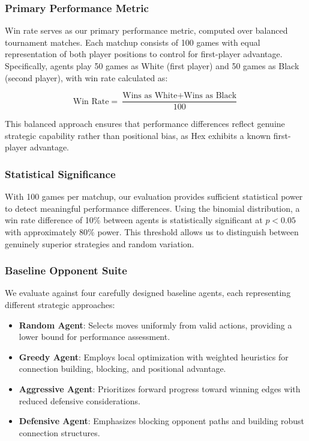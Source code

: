 \documentclass[conference]{IEEEtran}
\begin{document}
\subsubsection{Primary Performance Metric}

Win rate serves as our primary performance metric, computed over balanced tournament matches. Each matchup consists of 100 games with equal representation of both player positions to control for first-player advantage. Specifically, agents play 50 games as White (first player) and 50 games as Black (second player), with win rate calculated as:

\begin{equation}
\text{Win Rate} = \frac{\text{Wins as White} + \text{Wins as Black}}{100}
\end{equation}

This balanced approach ensures that performance differences reflect genuine strategic capability rather than positional bias, as Hex exhibits a known first-player advantage.

\subsubsection{Statistical Significance}

With 100 games per matchup, our evaluation provides sufficient statistical power to detect meaningful performance differences. Using the binomial distribution, a win rate difference of 10\% between agents is statistically significant at $p < 0.05$ with approximately 80\% power. This threshold allows us to distinguish between genuinely superior strategies and random variation.

\subsubsection{Baseline Opponent Suite}

We evaluate against four carefully designed baseline agents, each representing different strategic approaches:

\begin{itemize}
\item \textbf{Random Agent}: Selects moves uniformly from valid actions, providing a lower bound for performance assessment.
\item \textbf{Greedy Agent}: Employs local optimization with weighted heuristics for connection building, blocking, and positional advantage.
\item \textbf{Aggressive Agent}: Prioritizes forward progress toward winning edges with reduced defensive considerations.
\item \textbf{Defensive Agent}: Emphasizes blocking opponent paths and building robust connection structures.
\end{itemize}
\end{document}

